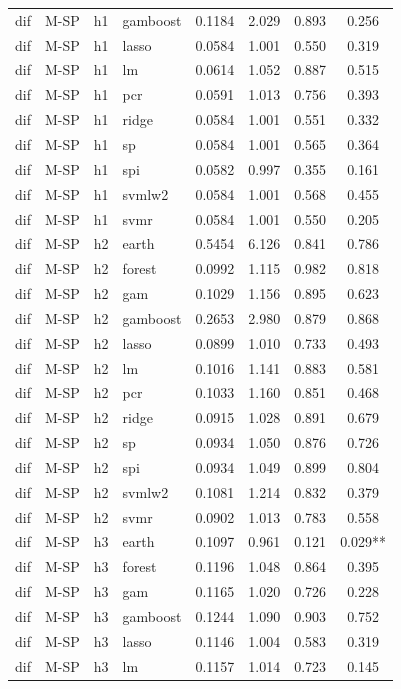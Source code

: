 \begin{ThreePartTable}
\begin{longtable}[t]{llclcccc}
dif & M-SP & h1 & gamboost & 0.1184 & 2.029 & 0.893 & 0.256\\
dif & M-SP & h1 & lasso & 0.0584 & 1.001 & 0.550 & 0.319\\
dif & M-SP & h1 & lm & 0.0614 & 1.052 & 0.887 & 0.515\\
dif & M-SP & h1 & pcr & 0.0591 & 1.013 & 0.756 & 0.393\\
dif & M-SP & h1 & ridge & 0.0584 & 1.001 & 0.551 & 0.332\\
dif & M-SP & h1 & sp & 0.0584 & 1.001 & 0.565 & 0.364\\
dif & M-SP & h1 & spi & 0.0582 & 0.997 & 0.355 & 0.161\\
dif & M-SP & h1 & svmlw2 & 0.0584 & 1.001 & 0.568 & 0.455\\
dif & M-SP & h1 & svmr & 0.0584 & 1.001 & 0.550 & 0.205\\
\addlinespace
dif & M-SP & h2 & earth & 0.5454 & 6.126 & 0.841 & 0.786\\
dif & M-SP & h2 & forest & 0.0992 & 1.115 & 0.982 & 0.818\\
dif & M-SP & h2 & gam & 0.1029 & 1.156 & 0.895 & 0.623\\
dif & M-SP & h2 & gamboost & 0.2653 & 2.980 & 0.879 & 0.868\\
dif & M-SP & h2 & lasso & 0.0899 & 1.010 & 0.733 & 0.493\\
dif & M-SP & h2 & lm & 0.1016 & 1.141 & 0.883 & 0.581\\
dif & M-SP & h2 & pcr & 0.1033 & 1.160 & 0.851 & 0.468\\
dif & M-SP & h2 & ridge & 0.0915 & 1.028 & 0.891 & 0.679\\
dif & M-SP & h2 & sp & 0.0934 & 1.050 & 0.876 & 0.726\\
dif & M-SP & h2 & spi & 0.0934 & 1.049 & 0.899 & 0.804\\
dif & M-SP & h2 & svmlw2 & 0.1081 & 1.214 & 0.832 & 0.379\\
dif & M-SP & h2 & svmr & 0.0902 & 1.013 & 0.783 & 0.558\\
\addlinespace
dif & M-SP & h3 & earth & 0.1097 & 0.961 & 0.121 & 0.029**\\
dif & M-SP & h3 & forest & 0.1196 & 1.048 & 0.864 & 0.395\\
dif & M-SP & h3 & gam & 0.1165 & 1.020 & 0.726 & 0.228\\
dif & M-SP & h3 & gamboost & 0.1244 & 1.090 & 0.903 & 0.752\\
dif & M-SP & h3 & lasso & 0.1146 & 1.004 & 0.583 & 0.319\\
dif & M-SP & h3 & lm & 0.1157 & 1.014 & 0.723 & 0.145\\

\end{longtable}
\end{ThreePartTable}
